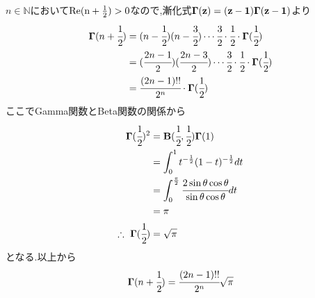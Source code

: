 \setcounter{section}{2}
\setcounter{subsection}{0}
\setcounter{equation}{0}
\subsection{}
$n\in\mathbb{N}$において$\rm{Re}(n+\frac{1}{2})>0$なので,漸化式$\bf{\Gamma}(z)=(z-1)\bf{\Gamma}(z-1)$より
\begin{align}
  {\bf\Gamma}(n+\cfrac{1}{2})&=(n-\cfrac{1}{2})(n-\cfrac{3}{2})\cdots\cfrac{3}{2}\cdot\cfrac{1}{2}\cdot{\bf\Gamma}(\cfrac{1}{2})\\
  &=(\cfrac{2n-1}{2})(\cfrac{2n-3}{2})\cdots\cfrac{3}{2}\cdot\cfrac{1}{2}\cdot{\bf\Gamma}(\cfrac{1}{2})\\
  &=\cfrac{(2n-1)!!}{2^n}\cdot{\bf\Gamma}(\cfrac{1}{2})
\end{align}
ここでGamma関数とBeta関数の関係から
\begin{align}
  \begin{split}
    {\bf\Gamma}(\cfrac{1}{2})^2&={\rm{\bf{B}}}(\cfrac{1}{2},\cfrac{1}{2}){\bf\Gamma}(1)\\
    &=\int^1_0t^{-\frac{1}{2}}(1-t)^{-\frac{1}{2}}dt\\
    &=\int^{\frac{\pi}{2}}_0\cfrac{2\sin\theta\cos\theta}{\sin\theta\cos\theta}dt\\
    &=\pi\\
    \therefore\ {\bf\Gamma}(\cfrac{1}{2})&=\sqrt{\pi}
  \end{split}
\end{align}
となる.以上から
\begin{align*}
  {\bf\Gamma}(n+\cfrac{1}{2})=\cfrac{(2n-1)!!}{2^n}\sqrt{\pi}
\end{align*}
\newpage
